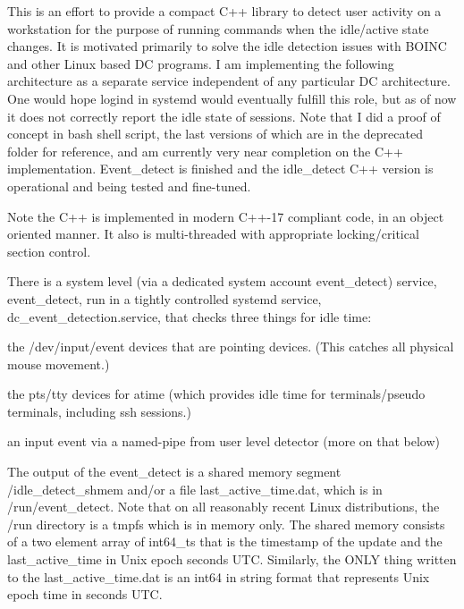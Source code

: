 This is an effort to provide a compact C++ library to detect user activity on a workstation for the purpose of running commands when the idle/active state changes. It is motivated primarily to solve the idle detection issues with B\+O\+I\+NC and other Linux based DC programs. I am implementing the following architecture as a separate service independent of any particular DC architecture. One would hope logind in systemd would eventually fulfill this role, but as of now it does not correctly report the idle state of sessions. Note that I did a proof of concept in bash shell script, the last versions of which are in the deprecated folder for reference, and am currently very near completion on the C++ implementation. Event\+\_\+detect is finished and the idle\+\_\+detect C++ version is operational and being tested and fine-\/tuned.

Note the C++ is implemented in modern C++-\/17 compliant code, in an object oriented manner. It also is multi-\/threaded with appropriate locking/critical section control.


\begin{DoxyEnumerate}
\item There is a system level (via a dedicated system account event\+\_\+detect) service, event\+\_\+detect, run in a tightly controlled systemd service, dc\+\_\+event\+\_\+detection.\+service, that checks three things for idle time\+:
\begin{DoxyItemize}
\item the /dev/input/event devices that are pointing devices. (This catches all physical mouse movement.)
\item the pts/tty devices for atime (which provides idle time for terminals/pseudo terminals, including ssh sessions.)
\item an input event via a named-\/pipe from user level detector (more on that below)
\end{DoxyItemize}
\end{DoxyEnumerate}

The output of the event\+\_\+detect is a shared memory segment /idle\+\_\+detect\+\_\+shmem and/or a file last\+\_\+active\+\_\+time.\+dat, which is in /run/event\+\_\+detect. Note that on all reasonably recent Linux distributions, the /run directory is a tmpfs which is in memory only. The shared memory consists of a two element array of int64\+\_\+t\textquotesingle{}s that is the timestamp of the update and the last\+\_\+active\+\_\+time in Unix epoch seconds U\+TC. Similarly, the O\+N\+LY thing written to the last\+\_\+active\+\_\+time.\+dat is an int64 in string format that represents Unix epoch time in seconds U\+TC.


